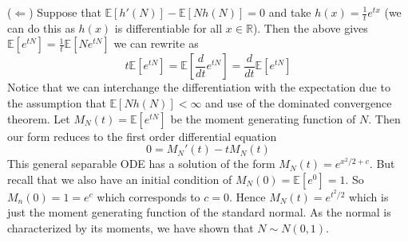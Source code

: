 \documentclass[12pt]{article}  %
\newcommand{\R}{{\mathbb{R}}}
\newcommand{\E}{{\mathbb{E}}}
\begin{document}
\begin{enumerate}
($\Longleftarrow$) Suppose that $\E[h'(N)] - \E[Nh(N)] = 0$ and take $h(x) = \frac{1}{t}e^{tx}$ (we can do this as $h(x)$ is differentiable for all $x\in\R$). Then the above gives $\E[e^{tN}] = \frac{1}{t}\E[Ne^{tN}]$ we can rewrite as $$t\E[e^{tN}] = \E[\frac{d}{dt}e^{tN}] = \frac{d}{dt}\E[e^{tN}]$$ Notice that we can interchange the differentiation with the expectation due to the assumption that $\E[Nh(N)]<\infty$ and use of the dominated convergence theorem. Let $M_N(t) = \E[e^{tN}]$ be the moment generating function of $N$. Then our form reduces to the first order differential equation $$0 = M_N'(t) - tM_N(t)$$ This general separable ODE has a solution of the form $M_N(t) = e^{x^2/2 + c}$. But recall that we also have an initial condition of $M_N(0) = \E[e^{0}] = 1$. So $M_n(0) = 1 = e^c$ which corresponds to $c = 0$. Hence $M_N(t) = e^{t^2/2}$ which is just the moment generating function of the standard normal. As the normal is characterized by its moments, we have shown that $N\sim N(0,1)$. 


\end{enumerate}
\end{document}
